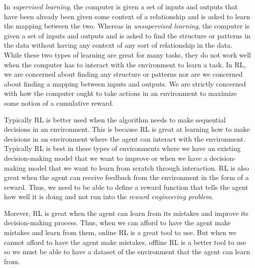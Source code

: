 In \emph{supervised learning}, the computer is given a set of inputs and outputs that have been already been given some context of a relationship and is asked to learn the mapping between the two.
Whereas in \emph{unsupervised learning}, the computer is given a set of inputs and outputs and is asked to find the structure or patterns in the data without having any context of any sort of relationship in the data.
While these two types of learning are great for many tasks, they do not work well when the computer has to interact with the environment to learn a task.
In RL, we are concerned about finding any structure or patterns nor are we concerned about finding a mapping between inputs and outputs.
We are strictly concerned with how the computer ought to take actions in an environment to maximize some notion of a cumulative reward.

Typically RL is better used when the algorithm needs to make sequential decisions in an environment.
This is because RL is great at learning how to make decisions in an environment where the agent can interact with the environment.
Typically RL is best in these types of environments where we have an existing decision-making model that we want to improve or when we have a decision-making model that we want to learn from scratch through interaction.
RL is also great when the agent can receive feedback from the environment in the form of a reward.
Thus, we need to be able to define a reward function that tells the agent how well it is doing and not run into the \emph{reward engineering problem}.

Morever, RL is great when the agent can learn from its mistakes and improve its decision-making process.
Thus, when we can afford to have the agent make mistakes and learn from them, online RL is a great tool to use.
But when we cannot afford to have the agent make mistakes, offline RL is a better tool to use so we must be able to have a dataset of the environment that the agent can learn from.

